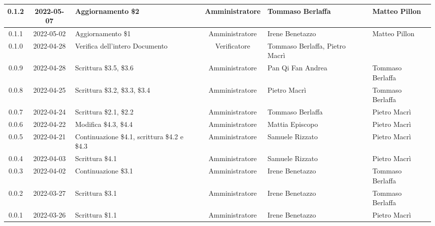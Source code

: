 \begin{center}
\begin{longtable}{ |c|c|p{8em}|c|m{5em}|m{6em}| }
    \hline
	0.1.2 & 2022-05-07 & Aggiornamento \$2 & Amministratore & Tommaso \newline Berlaffa & Matteo \newline Pillon\\
    \hline
	0.1.1 & 2022-05-02 & Aggiornamento \$1 & Amministratore & Irene \newline Benetazzo & Matteo \newline Pillon\\
	\hline
	0.1.0 & 2022-04-28 & Verifica dell'intero Documento & Verificatore & Tommaso Berlaffa, \newline Pietro Macrì & \\
	\hline
	0.0.9 & 2022-04-28 & Scrittura \newline \$3.5, \$3.6 & Amministratore & Pan Qi Fan \newline Andrea & Tommaso \newline Berlaffa\\
	\hline
	0.0.8 & 2022-04-25 & Scrittura \newline \$3.2, \$3.3, \$3.4 & Amministratore& Pietro \newline Macrì & Tommaso \newline Berlaffa\\
	\hline
	0.0.7 & 2022-04-24 & Scrittura \newline \$2.1, \$2.2 & Amministratore & Tommaso \newline Berlaffa & Pietro \newline Macrì\\
	\hline
	0.0.6 & 2022-04-22 & Modifica \newline \$4.3, \$4.4 & Amministratore & Mattia \newline Episcopo & Pietro \newline Macrì\\
	\hline
	0.0.5 & 2022-04-21 & Continuazione \$4.1, scrittura \$4.2 e \$4.3 & Amministratore & Samuele \newline Rizzato & Pietro \newline Macrì\\
	\hline
	0.0.4 & 2022-04-03 & Scrittura \$4.1 & Amministratore & Samuele \newline Rizzato & Pietro \newline Macrì\\
	\hline
	0.0.3 & 2022-04-02 & Continuazione \$3.1 & Amministratore & Irene \newline Benetazzo & Tommaso \newline Berlaffa \\
	\hline
	0.0.2 & 2022-03-27 & Scrittura \$3.1 & Amministratore & Irene \newline Benetazzo & Tommaso \newline Berlaffa \\
	\hline
	0.0.1 & 2022-03-26 & Scrittura \$1.1 & Amministratore & Irene \newline Benetazzo & Pietro \newline Macrì \\
	\hline
	\end{longtable}
	\end{center}
	\newpage